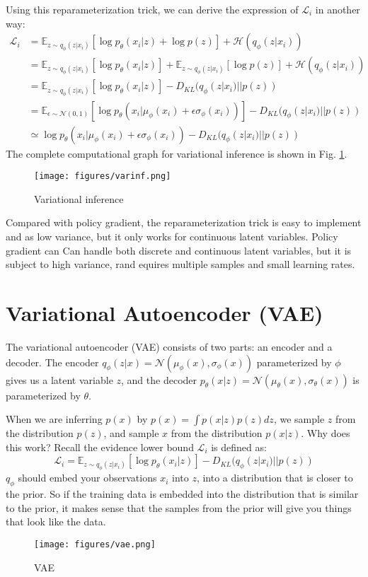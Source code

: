 Using this reparameterization trick, we can derive the expression of $\mathcal{L}_i$ in another way:
\begin{align*}
    \mathcal{L}_i &= \mathbb{E}_{z\sim q_\phi(z|x_i)}\left[\log p_\theta(x_i|z) + \log p(z)\right]+\mathcal{H}(q_\phi(z|x_i))\\
    &= \mathbb{E}_{z\sim q_\phi(z|x_i)}\left[\log p_\theta(x_i|z)\right] + \mathbb{E}_{z\sim q_\phi(z|x_i)}\left[\log p(z)\right] + \mathcal{H}(q_\phi(z|x_i))\\
    &=  \mathbb{E}_{z\sim q_\phi(z|x_i)}\left[\log p_\theta(x_i|z)\right] - D_{KL}(q_\phi(z|x_i)||p(z))\\
    &= \mathbb{E}_{\epsilon\sim \mathcal{N}(0,1)}\left[\log p_\theta(x_i|\mu_\phi(x_i)+\epsilon\sigma_\phi(x_i))\right] - D_{KL}(q_\phi(z|x_i)||p(z))\\
    &\simeq \log p_\theta( x_i|\mu_\phi(x_i)+\epsilon\sigma_\phi(x_i)) - D_{KL}(q_\phi(z|x_i)||p(z))
\end{align*}
The complete computational graph for variational inference is shown in Fig. \ref{fig:varinf}. 
\begin{figure}
    \centering
    \texttt{[image: figures/varinf.png]}
    \caption{Variational inference}
    \label{fig:varinf}
\end{figure}

Compared with policy gradient, the reparameterization trick is easy to implement and as low variance, but it only works for continuous latent variables. Policy gradient can Can handle both discrete and continuous latent variables, but it is subject to high variance, rand equires multiple samples and small learning rates.

\section{Variational Autoencoder (VAE)}
The variational autoencoder (VAE) consists of two parts: an encoder and a decoder. The encoder $q_\phi(z|x) = \mathcal{N}(\mu_\phi(x),\sigma_\phi(x))$ parameterized by $\phi$ gives us a latent variable $z$, and the decoder $p_\theta(x|z) = \mathcal{N}(\mu_\theta(x),\sigma_\theta(x))$ is parameterized by $\theta$.

When we are inferring $p(x)$ by $p(x) = \int p(x|z)p(z)dz$, we sample $z$ from the distribution $p(z)$, and sample $x$ from the distribution $p(x|z)$. Why does this work? Recall the evidence lower bound $\mathcal{L}_i$ is defined as:
\[
\mathcal{L}_i=  \mathbb{E}_{z\sim q_\phi(z|x_i)}\left[\log p_\theta(x_i|z)\right] - D_{KL}(q_\phi(z|x_i)||p(z))
\]
$q_\phi$ should embed your observations $x_i$ into $z$, into a distribution that is closer to the prior. So if the training data is embedded into the distribution that is similar to the prior, it makes sense that the samples from the prior will give you things that look like the data.
\begin{figure}[H]
    \centering
    \texttt{[image: figures/vae.png]}
    \caption{VAE}
    \label{fig:vae}
\end{figure}